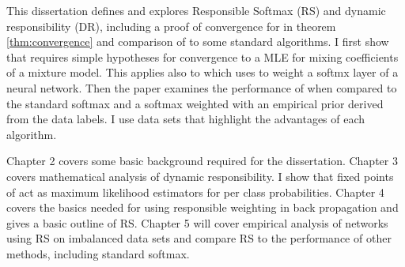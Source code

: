 This dissertation defines and explores Responsible Softmax (RS) and dynamic responsibility (DR), including a proof of convergence for \DR in theorem \ref{thm:convergence} and comparison of \RS to some standard algorithms.  I first show that \DR requires simple hypotheses for convergence to a MLE for mixing coefficients of a mixture model. This applies also to \RS which uses \DR to weight a softmx layer of a neural network.  Then the paper examines the performance of \RS when compared to the standard softmax and a softmax weighted with an empirical prior derived from the data labels.  I use data sets that highlight the advantages of each algorithm.

Chapter 2 covers some basic background required for the dissertation.  Chapter 3 covers mathematical analysis of dynamic responsibility. I show that fixed points of \DR act as maximum likelihood estimators for per class probabilities. Chapter 4 covers the basics needed for using responsible weighting in back propagation and gives a basic outline of RS. Chapter 5 will cover empirical analysis of networks using RS on imbalanced data sets and compare RS to the performance of other methods, including standard softmax.